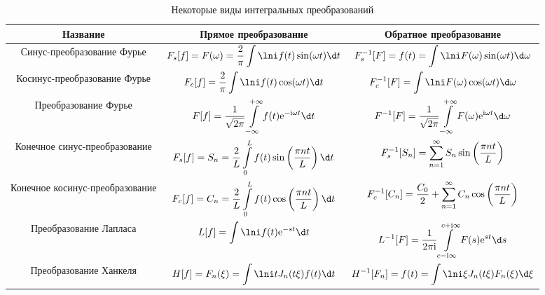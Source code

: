 \begin{table}[h!]
    \center
    \caption{Некоторые виды интегральных преобразований}
    \begin{tabular}{|C{.17}|C{.4}|C{.4}|} \hline
        Название & Прямое преобразование & Обратное преобразование \\ \hline
        Синус-преобразование Фурье &
        \( \ds
            F_s[f] = F(\omega) = \frac{2}{\pi}\int\lni f(t)\sin(\omega t)\d t
        \)
        &
        \( \ds
            F_s^{-1}[F] = f(t) = \int\lni F(\omega)\sin(\omega t)\d\omega
        \) \\ \hline
        Косинус-преобразование Фурье &
        \( \ds
            F_c[f] = \frac{2}{\pi}\int\lni f(t)\cos(\omega t)\d t
        \)
        &
        \( \ds
            F_c^{-1}[F] = \int\lni F(\omega)\cos(\omega t)\d\omega
        \) \\ \hline
        Преобразование Фурье &
        \( \ds
            F[f] = \frac{1}{\sqrt{2\pi}}\int\limits_{-\infty}^{+\infty} f(t)
            \e^{-\i\omega t}\d t
        \)
        &
        \( \ds
            F^{-1}[F] = \frac{1}{\sqrt{2\pi}}\int\limits_{-\infty}^{+\infty}
            F(\omega)\e^{\i\omega t}\d\omega
        \) \\ \hline
        Конечное синус-преобразование &
        \( \ds
            F_s[f] = S_n = \frac{2}{L}\int\limits_0^L f(t)\sin\left(
            \frac{\pi nt}{L}\right)\d t
        \)
        &
        \( \displaystyle
            F_s^{-1}[S_n] = \sum\limits_{n=1}^\infty S_n\sin\left(
            \frac{\pi nt}{L}\right)
        \) \\ \hline
        Конечное косинус-преобразование &
        \( \ds
            F_c[f] = C_n = \frac{2}{L}\int\limits_0^L f(t)\cos\left(
            \frac{\pi nt}{L}\right)\d t
        \)
        &
        \( \displaystyle
            F_c^{-1}[C_n] = \frac{C_0}{2} + \sum\limits_{n=1}^\infty
            C_n\cos\left(\frac{\pi nt}{L}\right)
        \) \\ \hline
        Преобразование Лапласа &
        \( \ds
            L[f] = \int\lni f(t)\e^{-st}\d t
        \)
        &
        \( \ds
            L^{-1}[F] = \frac{1}{2\pi\i}\int\limits_{c-\i\infty}^{c+\i\infty}
            F(s)\e^{st}\d s
        \) \\ \hline
        Преобразование Ханкеля &
        \( \ds
            H[f] = F_n(\xi) = \int\lni tJ_n(t\xi)f(t)\d t
        \)
        &
        \( \ds
            H^{-1}[F_n] = f(t) = \int\lni \xi J_n(t\xi)F_n(\xi)\d\xi
        \) \\ \hline
    \end{tabular}
\end{table}

